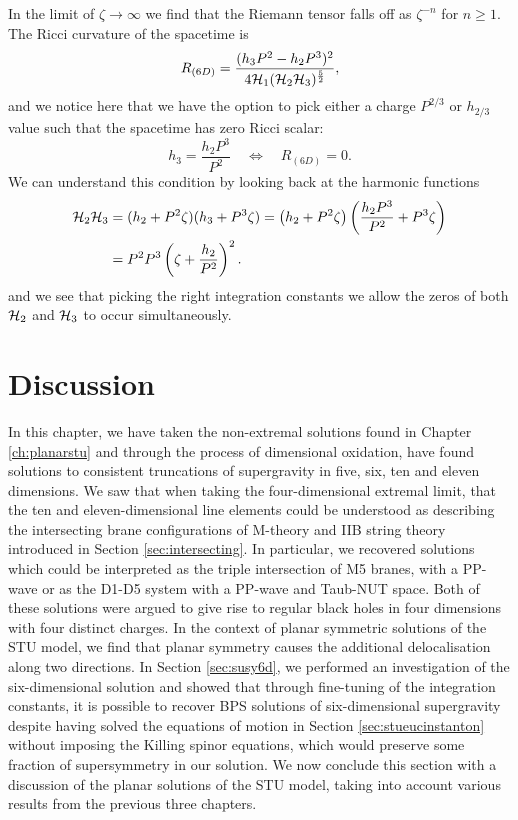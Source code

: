 In the limit of $\zeta \rightarrow \infty$ we find that the Riemann tensor falls off as $\zeta^{-n}$ for $n \geq 1$. The Ricci curvature of the spacetime is
\begin{equation*}
    R_{(6D)} = \frac{(h_3 P^2 - h_2 P^3)^2}{4{\cal H}_1({\cal H}_2 {\cal H}_3)^{\frac{5}{2}}},
\end{equation*}
and we notice here that we have the option to pick either a charge $P^{2/3}$ or $h_{2/3}$ value such that the spacetime has zero Ricci scalar:
\begin{equation*}
    h_3 = \frac{h_2 P^3}{P^2} \quad \Leftrightarrow \quad R_{(6D)} = 0.
\end{equation*}
We can understand this condition by looking back at the harmonic functions
\begin{equation*}
\begin{aligned}
        {\cal H}_2 {\cal H}_3 &= (h_2 + P^2 \zeta)(h_3 + P^3 \zeta) = \left(h_2 + P^2 \zeta \right) \left(\frac{h_2 P^3}{P^2} + P^3 \zeta \right) \\
        &= P^2 P^3 \left(\zeta + \frac{h_2}{P^2}\right)^2.
\end{aligned}
\end{equation*}
and we see that picking the right integration constants we allow the zeros of both ${\cal H}_2$ and ${\cal H}_3$ to occur simultaneously.



\section{Discussion}
\label{sec:branediscussion}
In this chapter, we have taken the non-extremal solutions found in Chapter \ref{ch:planarstu} and through the process of dimensional oxidation, have found solutions to consistent truncations of supergravity in five, six, ten and eleven dimensions. We saw that when taking the four-dimensional extremal limit, that the ten and eleven-dimensional line elements could be understood as describing the intersecting brane configurations of M-theory and IIB string theory introduced in Section \ref{sec:intersecting}. In particular, we recovered solutions which could be interpreted as the triple intersection of M5 branes, with a PP-wave or as the D1-D5 system with a PP-wave and Taub-NUT space. Both of these solutions were argued to give rise to regular black holes in four dimensions with four distinct charges. In the context of planar symmetric solutions of the STU model, we find that planar symmetry causes the additional delocalisation along two directions. In Section \ref{sec:susy6d}, we performed an investigation of the six-dimensional solution and showed that through fine-tuning of the integration constants, it is possible to recover BPS solutions of six-dimensional supergravity despite having solved the equations of motion in Section \ref{sec:stueucinstanton} without imposing the Killing spinor equations, which would preserve some fraction of supersymmetry in our solution. We now conclude this section with a discussion of the planar solutions of the STU model, taking into account various results from the previous three chapters. 

